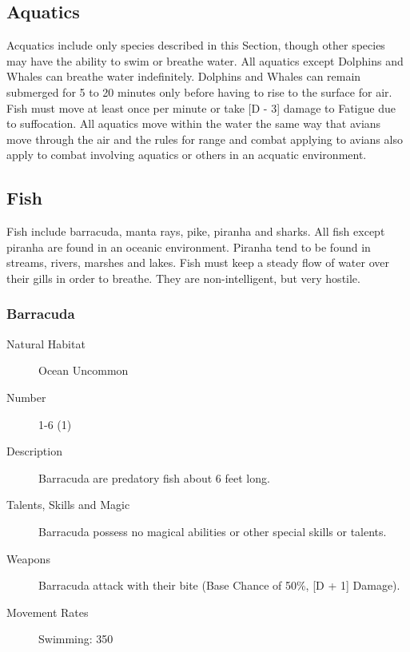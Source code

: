 \begin{multicols}{2}

\setlength\columnseprule{0.2mm}

\section{Aquatics}
Acquatics include only species described in this Section, though other
species may have the ability to swim or breathe water. All aquatics
except Dolphins and Whales can breathe water indefinitely.  Dolphins
and Whales can remain submerged for 5 to 20 minutes only before having
to rise to the surface for air.  Fish must move at least once per
minute or take [D - 3] damage to Fatigue due to suffocation.  All
aquatics move within the water the same way that avians move through
the air and the rules for range and combat applying to avians also
apply to combat involving aquatics or others in an acquatic
environment.

\subsection{Fish}
Fish include barracuda, manta rays, pike, piranha and sharks. All fish
except piranha are found in an oceanic environment.  Piranha tend to
be found in streams, rivers, marshes and lakes. Fish must keep a
steady flow of water over their gills in order to breathe. They are
non-intelligent, but very hostile.

\subsubsection{Barracuda}

\begin{description}
\item[Natural Habitat] Ocean Uncommon

\item[Number] 1-6 (1)

\item[Description] Barracuda are predatory fish about 6 feet long.

\item[Talents, Skills and Magic] Barracuda possess no magical abilities or other special
skills or talents.

\item[Weapons] Barracuda attack with their bite (Base Chance of 50\%,
[D + 1] Damage).

\item[Movement Rates] Swimming: 350


\end{description}
\end{multicols}
